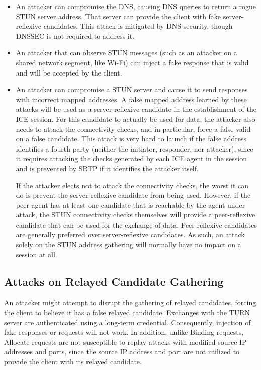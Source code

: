 \documentclass{article}
\begin{document}
\begin{itemize}
\item An attacker can compromise the DNS, causing DNS queries to return a rogue STUN server address.  That server can provide the client with fake server-reflexive candidates.  This attack is mitigated by DNS security, though DNSSEC is not required to address it.
\item An attacker that can observe STUN messages (such as an attacker on a shared network segment, like Wi-Fi) can inject a fake response that is valid and will be accepted by the client.
\item An attacker can compromise a STUN server and cause it to send responses with incorrect mapped addresses.
A false mapped address learned by these attacks will be used as a server-reflexive candidate in the establishment of the ICE session. For this candidate to actually be used for data, the attacker also needs to attack the connectivity checks, and in particular, force a false valid on a false candidate.  This attack is very hard to launch if the false address identifies a fourth party (neither the initiator, responder, nor attacker), since it requires attacking the checks generated by each ICE agent in the session and is prevented by SRTP if it identifies the attacker itself.

If the attacker elects not to attack the connectivity checks, the worst it can do is prevent the server-reflexive candidate from being used.  However, if the peer agent has at least one candidate that is reachable by the agent under attack, the STUN connectivity checks themselves will provide a peer-reflexive candidate that can be used for the exchange of data.  Peer-reflexive candidates are generally preferred over server-reflexive candidates.  As such, an attack solely on the STUN address gathering will normally have no impact on a session at all.

\end{itemize}
\subsection{Attacks on Relayed Candidate Gathering}

An attacker might attempt to disrupt the gathering of relayed candidates, forcing the client to believe it has a false relayed candidate.  Exchanges with the TURN server are authenticated using a long-term credential.  Consequently, injection of fake responses or requests will not work.  In addition, unlike Binding requests, Allocate requests are not susceptible to replay attacks with modified source IP addresses and ports, since the source IP address and port are not utilized to provide the client with its relayed candidate.
\end{document}
